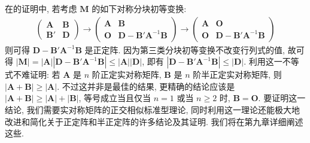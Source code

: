 \documentclass[../../main.tex]{subfiles}
\begin{document}
\begin{remark}
在的证明中, 若考虑 \(\boldsymbol{M}\) 的如下对称分块初等变换:
\begin{align*}
\begin{pmatrix}\boldsymbol{A}&\boldsymbol{B}\\\boldsymbol{B}'&\boldsymbol{D}\end{pmatrix}\to\begin{pmatrix}\boldsymbol{A}&\boldsymbol{B}\\\boldsymbol{O}&\boldsymbol{D}-\boldsymbol{B}'\boldsymbol{A}^{-1}\boldsymbol{B}\end{pmatrix}\to\begin{pmatrix}\boldsymbol{A}&\boldsymbol{O}\\\boldsymbol{O}&\boldsymbol{D}-\boldsymbol{B}'\boldsymbol{A}^{-1}\boldsymbol{B}\end{pmatrix}
\end{align*}
则可得 \(\boldsymbol{D}-\boldsymbol{B}'\boldsymbol{A}^{-1}\boldsymbol{B}\) 是正定阵. 因为第三类分块初等变换不改变行列式的值, 故可得 \(|\boldsymbol{M}|=|\boldsymbol{A}||\boldsymbol{D}-\boldsymbol{B}'\boldsymbol{A}^{-1}\boldsymbol{B}|\leq|\boldsymbol{A}||\boldsymbol{D}|\), 即有 \(|\boldsymbol{D}-\boldsymbol{B}'\boldsymbol{A}^{-1}\boldsymbol{B}|\leq|\boldsymbol{D}|\). 利用这一不等式不难证明: 若 \(\boldsymbol{A}\) 是 \(n\) 阶正定实对称矩阵, \(\boldsymbol{B}\) 是 \(n\) 阶半正定实对称矩阵, 则 \(|\boldsymbol{A}+\boldsymbol{B}|\geq|\boldsymbol{A}|\). 不过这并非是最佳的结果, 更精确的结论应该是 \(|\boldsymbol{A}+\boldsymbol{B}|\geq|\boldsymbol{A}|+|\boldsymbol{B}|\), 等号成立当且仅当 \(n = 1\) 或当 \(n\geq2\) 时, \(\boldsymbol{B}=\boldsymbol{O}\). 要证明这一结论, 我们需要实对称矩阵的正交相似标准型理论, 同时利用这一理论还能极大地改进和简化关于正定阵和半正定阵的许多结论及其证明. 我们将在第九章详细阐述这些.
\end{remark}
\end{document}
